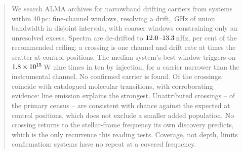 \begin{abstract}
We search ALMA archives for narrowband drifting carriers from \NSysClassA{}
systems within 40\,pc: \NWinA{} fine-channel windows, \EdrNWinA{} resolving
a drift, \CvUnionA\,GHz of union bandwidth in \CovNIslands{} disjoint
intervals, with \NWinB{} coarser windows constraining only an unresolved
excess. Spectra are de-drifted to $\DriftCeilLo$--$\DriftCeilHi$\,nHz,
\AccelSheikhPct{} per cent of the recommended ceiling; a crossing is one
channel and drift rate at \StageNullTrig{} times the scatter at control
positions. The median system's best window triggers on
$\EirpNinetySysMedA$\,W nine times in ten by injection, for a carrier
narrower than the instrumental channel.
No confirmed carrier is found. Of the crossings, \MkNCoinc{} coincide with
catalogued molecular transitions, \LnAttrSupp{} with corroborating evidence:
line emission explains the strongest. Unattributed crossings -- \CeObs{} of
the primary census -- are consistent with chance against the \CeExp{}
expected at control positions, which does not exclude a smaller added
population. No crossing returns to the stellar-frame frequency its own
discovery predicts, which is the only recurrence this reading tests.
Coverage, not depth, limits confirmation: \ZcNoRepSys{} systems have no
repeat at a covered frequency.
\end{abstract}


